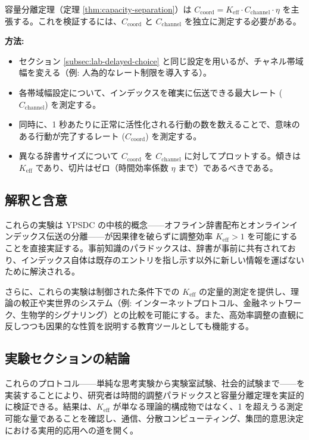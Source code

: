 \documentclass[12pt,a4paper]{ltjsarticle}
\begin{document}
	容量分離定理（定理 \ref{thm:capacity-separation}）は \(C_{\text{coord}} = K_{\mathrm{eff}} \cdot C_{\text{channel}} \cdot \eta\) を主張する。これを検証するには、\(C_{\text{coord}}\) と \(C_{\text{channel}}\) を独立に測定する必要がある。
	
	\textbf{方法:}
	\begin{itemize}
		\item セクション \ref{subsec:lab-delayed-choice} と同じ設定を用いるが、チャネル帯域幅を変える（例: 人為的なレート制限を導入する）。
		\item 各帯域幅設定について、インデックスを確実に伝送できる最大レート (\(C_{\text{channel}}\)) を測定する。
		\item 同時に、1 秒あたりに正常に活性化される行動の数を数えることで、意味のある行動が完了するレート (\(C_{\text{coord}}\)) を測定する。
		\item 異なる辞書サイズについて \(C_{\text{coord}}\) を \(C_{\text{channel}}\) に対してプロットする。傾きは \(K_{\mathrm{eff}}\) であり、切片はゼロ（時間効率係数 \(\eta\) まで）であるべきである。
	\end{itemize}
	
	\subsection{解釈と含意}
	
	これらの実験は YPSDC の中核的概念——オフライン辞書配布とオンラインインデックス伝送の分離——が因果律を破らずに調整効率 \(K_{\mathrm{eff}} > 1\) を可能にすることを直接実証する。事前知識のパラドックスは、辞書が事前に共有されており、インデックス自体は既存のエントリを指し示す以外に新しい情報を運ばないために解決される。
	
	さらに、これらの実験は制御された条件下での \(K_{\mathrm{eff}}\) の定量的測定を提供し、理論の較正や実世界のシステム（例: インターネットプロトコル、金融ネットワーク、生物学的シグナリング）との比較を可能にする。また、高効率調整の直観に反しつつも因果的な性質を説明する教育ツールとしても機能する。
	
	\subsection{実験セクションの結論}
	
	これらのプロトコル——単純な思考実験から実験室試験、社会的試験まで——を実装することにより、研究者は時間的調整パラドックスと容量分離定理を実証的に検証できる。結果は、\(K_{\mathrm{eff}}\) が単なる理論的構成物ではなく、1 を超えうる測定可能な量であることを確認し、通信、分散コンピューティング、集団的意思決定における実用的応用への道を開く。
	
\end{document}
